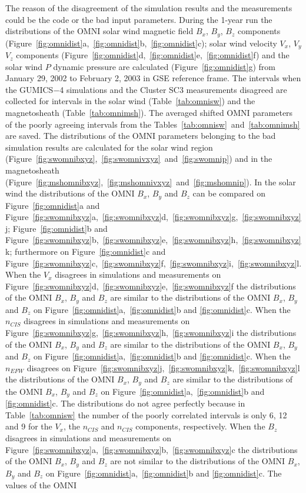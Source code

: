 \documentclass[linenumbers,draft]{agujournal}
\begin{document}
The reason of the disagreement of the simulation results and the measurements could be the code or the bad input parameters. During the 1-year run the distributions of the OMNI solar wind magnetic field $B_{x}$, $B_{y}$, $B_{z}$ components (Figure~\ref{fig:omnidist}a,~\ref{fig:omnidist}b,~\ref{fig:omnidist}c); solar wind velocity $V_{x}$, $V_{y}$ $V_{z}$ components (Figure~\ref{fig:omnidist}d,~\ref{fig:omnidist}e,~\ref{fig:omnidist}f) and the solar wind $P$ dynamic pressure are calculated (Figure~\ref{fig:omnidist}g) from January 29, 2002 to February 2, 2003 in GSE reference frame. The intervals when the GUMICS$-$4 simulations and the Cluster SC3 measurements disagreed are collected for intervals in the solar wind (Table~\ref{tab:omnisw}) and the magnetosheath (Table~\ref{tab:omnimsh}). The averaged shifted OMNI parameters of the poorly agreeing intervals from the Tables~\ref{tab:omnisw}~and~\ref{tab:omnimsh} are saved. The distributions of the OMNI parameters belonging to the bad simulation results are calculated for the solar wind region (Figure~\ref{fig:swomnibxyz},~\ref{fig:swomnivxyz}~and~\ref{fig:swomnip}) and in the magnetosheath (Figure~\ref{fig:mshomnibxyz},~\ref{fig:mshomnivxyz}~and~\ref{fig:mshomnip}). In the solar wind the distributions of the OMNI $B_{x}$, $B_{y}$ and $B_{z}$ can be compared on Figure~\ref{fig:omnidist}a and Figure~\ref{fig:swomnibxyz}a,~\ref{fig:swomnibxyz}d,~\ref{fig:swomnibxyz}g,~\ref{fig:swomnibxyz}j; Figure~\ref{fig:omnidist}b and Figure~\ref{fig:swomnibxyz}b,~\ref{fig:swomnibxyz}e,~\ref{fig:swomnibxyz}h,~\ref{fig:swomnibxyz}k; furthermore on Figure~\ref{fig:omnidist}c and Figure~\ref{fig:swomnibxyz}c,~\ref{fig:swomnibxyz}f,~\ref{fig:swomnibxyz}i,~\ref{fig:swomnibxyz}l. When the $V_{x}$ disagrees in simulations and measurements on Figure~\ref{fig:swomnibxyz}d,~\ref{fig:swomnibxyz}e,~\ref{fig:swomnibxyz}f the distributions of the OMNI $B_{x}$, $B_{y}$ and $B_{z}$ are similar to the distributions of the OMNI $B_{x}$, $B_{y}$ and $B_{z}$ on Figure~\ref{fig:omnidist}a,~\ref{fig:omnidist}b and \ref{fig:omnidist}c. When the $n_{CIS}$ disagrees in simulations and measurements on Figure~\ref{fig:swomnibxyz}g,~\ref{fig:swomnibxyz}h,~\ref{fig:swomnibxyz}i the distributions of the OMNI $B_{x}$, $B_{y}$ and $B_{z}$ are similar to the distributions of the OMNI $B_{x}$, $B_{y}$ and $B_{z}$ on Figure~\ref{fig:omnidist}a,~\ref{fig:omnidist}b and \ref{fig:omnidist}c. When the $n_{EFW}$ disagrees on Figure~\ref{fig:swomnibxyz}j,~\ref{fig:swomnibxyz}k,~\ref{fig:swomnibxyz}l the distributions of the OMNI $B_{x}$, $B_{y}$ and $B_{z}$ are similar to the distributions of the OMNI $B_{x}$, $B_{y}$ and $B_{z}$ on Figure~\ref{fig:omnidist}a,~\ref{fig:omnidist}b and \ref{fig:omnidist}c. The distributions do not agree perfectly because in Table~\ref{tab:omnisw} the number of the poorly correlated intervals is only 6, 12 and 9 for the $V_{x}$, the $n_{CIS}$ and $n_{CIS}$ components, respectively. When the $B_{z}$ disagrees in simulations and measurements on Figure~\ref{fig:swomnibxyz}a,~\ref{fig:swomnibxyz}b,~\ref{fig:swomnibxyz}c the distributions of the OMNI $B_{x}$, $B_{y}$ and $B_{z}$ are not similar to the distributions of the OMNI $B_{x}$, $B_{y}$ and $B_{z}$ on Figure~\ref{fig:omnidist}a,~\ref{fig:omnidist}b and \ref{fig:omnidist}c. The values of the OMNI 
\end{document}
